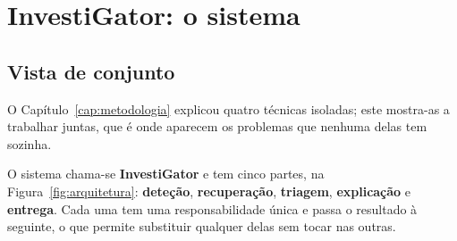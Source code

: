 
\chapter{InvestiGator: o sistema}
\label{cap:sistema}

\section{Vista de conjunto}
\label{sec:sis_vista}

O Capítulo~\ref{cap:metodologia} explicou quatro técnicas isoladas; este mostra-as a trabalhar
juntas, que é onde aparecem os problemas que nenhuma delas tem sozinha.

O sistema chama-se \textbf{InvestiGator} e tem cinco partes, na Figura~\ref{fig:arquitetura}:
\textbf{deteção}, \textbf{recuperação}, \textbf{triagem}, \textbf{explicação} e \textbf{entrega}.
Cada uma tem uma responsabilidade única e passa o resultado à seguinte, o que permite substituir
qualquer delas sem tocar nas outras.


